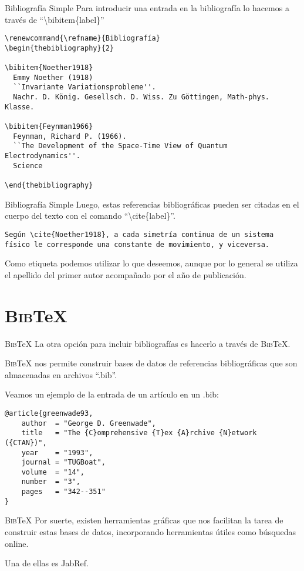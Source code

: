 \documentclass[11pt]{beamer}
\begin{document}
\begin{frame}[fragile]{Bibliografía Simple}
Para introducir una entrada en la bibliografía lo hacemos a través de ``\textbackslash bibitem\{label\}''

{\color{new_green} \scriptsize
\begin{verbatim}
\renewcommand{\refname}{Bibliografía}
\begin{thebibliography}{2}

\bibitem{Noether1918}
  Emmy Noether (1918)
  ``Invariante Variationsprobleme''.
  Nachr. D. König. Gesellsch. D. Wiss. Zu Göttingen, Math-phys. Klasse.

\bibitem{Feynman1966}
  Feynman, Richard P. (1966).
  ``The Development of the Space-Time View of Quantum Electrodynamics''.
  Science

\end{thebibliography}
\end{verbatim}
}
\end{frame}


\begin{frame}[fragile]{Bibliografía Simple}
Luego, estas referencias bibliográficas pueden ser citadas en el cuerpo del texto con el comando ``\textbackslash cite\{label\}''.

{\color{new_green} \scriptsize
\begin{verbatim}
Según \cite{Noether1918}, a cada simetría continua de un sistema
físico le corresponde una constante de movimiento, y viceversa.
\end{verbatim}
}

Como etiqueta podemos utilizar lo que deseemos, aunque por lo general se utiliza el apellido del primer autor acompañado por el año de publicación.

\end{frame}

\section{\textsc{Bib}\TeX{}}

\begin{frame}[fragile]{\textsc{Bib}\TeX{}}
La otra opción para incluir bibliografías es hacerlo a través de \textsc{Bib}\TeX{}.

\textsc{Bib}\TeX{} nos permite construir bases de datos de referencias bibliográficas que son almacenadas en archivos ``.bib''.

Veamos un ejemplo de la entrada de un artículo en un .bib:

{\color{new_green} \scriptsize
\begin{verbatim}
@article{greenwade93,
    author  = "George D. Greenwade",
    title   = "The {C}omprehensive {T}ex {A}rchive {N}etwork ({CTAN})",
    year    = "1993",
    journal = "TUGBoat",
    volume  = "14",
    number  = "3",
    pages   = "342--351"
}
\end{verbatim}
}
\end{frame}

\begin{frame}{\textsc{Bib}\TeX{}}
Por suerte, existen herramientas gráficas que nos facilitan la tarea de construir estas bases de datos, incorporando herramientas útiles como búsquedas online.

Una de ellas es JabRef.

\end{frame}
\end{document}

